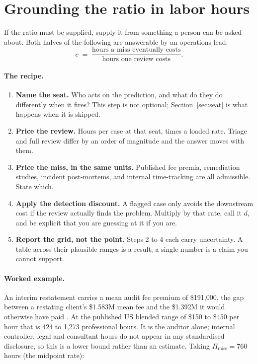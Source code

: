 \documentclass[11pt]{article}
\begin{document}
\section{Grounding the ratio in labor hours}
\label{sec:hours}

If the ratio must be supplied, supply it from something a person can be asked about. Both halves
of the following are answerable by an operations lead:
\[
c \;=\; \frac{\text{hours a miss eventually costs}}{\text{hours one review costs}} .
\]

\paragraph{The recipe.}
\begin{enumerate}[label=\textbf{\arabic*.}]
\item \textbf{Name the seat.} Who acts on the prediction, and what do they do differently when
it fires? This step is not optional; Section~\ref{sec:seat} is what happens when it is skipped.
\item \textbf{Price the review.} Hours per case at that seat, times a loaded rate. Triage and
full review differ by an order of magnitude and the answer moves with them.
\item \textbf{Price the miss, in the same units.} Published fee premia, remediation studies,
incident post-mortems, and internal time-tracking are all admissible. State which.
\item \textbf{Apply the detection discount.} A flagged case only avoids the downstream cost if
the review actually finds the problem. Multiply by that rate, call it $d$, and be explicit that
you are guessing at it if you are.
\item \textbf{Report the grid, not the point.} Steps 2 to 4 each carry uncertainty. A table
across their plausible ranges is a result; a single number is a claim you cannot support.
\end{enumerate}

\paragraph{Worked example.} An interim restatement carries a mean audit fee premium of
\$191{,}000, the gap between a restating client's \$1.583M mean fee and the \$1.392M it would
otherwise have paid \citep{interim2025}. At the published US blended range of \$150 to \$450 per
hour that is 424 to 1{,}273 professional hours. It is the auditor alone; internal controller,
legal and consultant hours do not appear in any standardised disclosure, so this is a lower
bound rather than an estimate. Taking $H_\text{miss} = 760$ hours (the midpoint rate):
\end{document}
